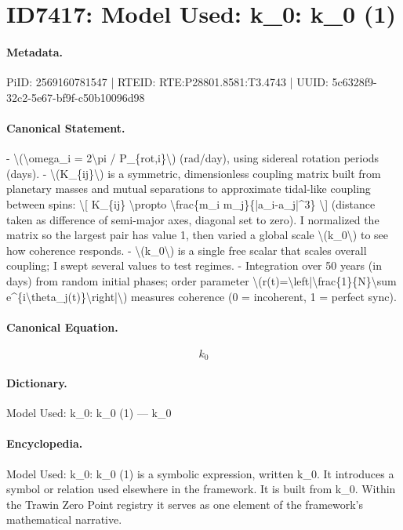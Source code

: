 \section*{ID7417: Model Used: k\_0: k\_0 (1)}
\paragraph{Metadata.}
PiID: 2569160781547 | RTEID: RTE:P28801.8581:T3.4743 | UUID: 5c6328f9-32c2-5e67-bf9f-c50b10096d98

\paragraph{Canonical Statement.}
- \textbackslash{}(\textbackslash{}omega\_i = 2\textbackslash{}pi / P\_\{rot,i\}\textbackslash{}) (rad/day), using sidereal rotation periods (days). - \textbackslash{}(K\_\{ij\}\textbackslash{}) is a symmetric, dimensionless coupling matrix built from planetary masses and mutual separations to approximate tidal-like coupling between spins: \textbackslash{}[ K\_\{ij\} \textbackslash{}propto \textbackslash{}frac\{m\_i m\_j\}\{|a\_i-a\_j|\textasciicircum{}3\} \textbackslash{}] (distance taken as difference of semi-major axes, diagonal set to zero). I normalized the matrix so the largest pair has value 1, then varied a global scale \textbackslash{}(k\_0\textbackslash{}) to see how coherence responds. - \textbackslash{}(k\_0\textbackslash{}) is a single free scalar that scales overall coupling; I swept several values to test regimes. - Integration over 50 years (in days) from random initial phases; order parameter \textbackslash{}(r(t)=\textbackslash{}left|\textbackslash{}frac\{1\}\{N\}\textbackslash{}sum e\textasciicircum{}\{i\textbackslash{}theta\_j(t)\}\textbackslash{}right|\textbackslash{}) measures coherence (0 = incoherent, 1 = perfect sync).

\paragraph{Canonical Equation.}
\[
k_0
\]

\paragraph{Dictionary.}
Model Used: k\_0: k\_0 (1) — k\_0

\paragraph{Encyclopedia.}
Model Used: k\_0: k\_0 (1) is a symbolic expression, written k\_0. It introduces a symbol or relation used elsewhere in the framework. It is built from k\_0. Within the Trawin Zero Point registry it serves as one element of the framework's mathematical narrative.

